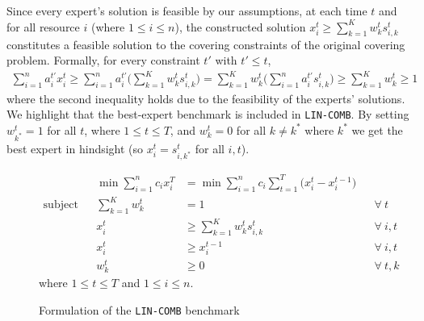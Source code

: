 Since every expert's solution is feasible by our assumptions, at each time $t$ and for all resource $i$ (where $1 \leq i \leq n$),
the constructed solution $x_{i}^{t} \geq \sum_{k=1}^{K} w_{k}^{t} s_{i,k}^{t}$ constitutes a feasible solution to the covering constraints of the original covering problem.
Formally, for every constraint $t'$ with $t' \leq t$,
%
\begin{align*}
\sum_{i=1}^{n} a_{i}^{t'} x_{i}^{t} \geq
%
\sum_{i=1}^{n} a_{i}^{t'} \biggl( \sum_{k=1}^{K} w_{k}^{t} s_{i,k}^{t} \biggr)
%
	= \sum_{k=1}^{K} w_{k}^{t}  \biggl( \sum_{i=1}^{n} a_{i}^{t'} s_{i,k}^{t} \biggr)
%
	\geq \sum_{k=1}^{K} w_{k}^{t} \geq 1
\end{align*}
%
where the second inequality holds due to the feasibility of the experts' solutions.
%
%
We highlight that the best-expert benchmark is included in \texttt{LIN-COMB}. By setting $w^{t}_{k^{*}} = 1$ for all $t$, where $1 \leq t \leq T$, and $w^{t}_{k} = 0$ for all $k \neq k^{*}$
where $k^{*}$ we get the best expert in hindsight (so $x_{i}^{t} = s_{i,k^{*}}^{t}$ for all $i,t$).

\begin{figure}
\begin{mdframed}
	\begin{align*}
		&& \min \sum_{i=1}^{n} c_{i} x_{i}^{T} &= \min \sum_{i=1}^{n} c_{i} \sum_{t=1}^{T}\bigl( x_{i}^{t} - x_{i}^{t-1}\bigr)\\
	\text{subject to} &&
		\sum_{k=1}^{K} w_{k}^{t} &= 1  && \forall\ t \\
		&& x_{i}^{t} &\geq \sum_{k=1}^{K} w_{k}^{t} s_{i,k}^{t} && \forall\ i, t\\
		&& x_{i}^{t} &\geq x_{i}^{t-1} && \forall\ i, t\\
		&& w_{k}^{t} &\geq 0  && \forall\ t, k
	\end{align*}
	where $1 \leq t \leq T$ and $1 \leq i \leq n$.
	\vspace{5pt}
\end{mdframed}
\caption{Formulation of the \texttt{LIN-COMB} benchmark}
\label{fig:benchmark}
\end{figure}

